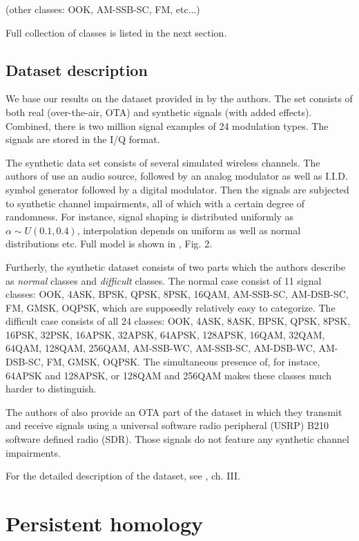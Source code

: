 \documentclass[12pt]{article}
\theoremstyle{plain}
\theoremstyle{definition}
\theoremstyle{remark}
\begin{document}
(other classes: OOK, AM-SSB-SC, FM, etc...)

	Full collection of classes is listed in the next section.
	

	
	\subsection{Dataset description}
	
	We base our results on the dataset provided in \cite{ORC} by the authors. The set consists of both real (over-the-air, OTA) and synthetic signals (with added effects). Combined, there is two million signal examples of 24 modulation types. The signals are stored in the I/Q format.
	
	The synthetic data set consists of several simulated wireless channels. The authors of \cite{ORC} use an audio source, followed by an analog modulator as well as I.I.D. symbol generator followed by a digital modulator. Then the signals are subjected to synthetic channel impairments, all of which with a certain degree of randomness. For instance, signal shaping is distributed uniformly as $\alpha \sim U(0.1, 0.4)$, interpolation depends on uniform as well as normal distributions etc. Full model is shown in \cite{ORC}, Fig. 2.
	
	Furtherly, the synthetic dataset consists of two parts which the authors describe as \textit{normal} classes and \textit{difficult} classes. The normal case consist of 11 signal classes: OOK, 4ASK, BPSK, QPSK, 8PSK, 16QAM, AM-SSB-SC, AM-DSB-SC, FM, GMSK, OQPSK, which are supposedly relatively easy to categorize. The difficult case consists of all 24 classes: OOK, 4ASK, 8ASK, BPSK, QPSK, 8PSK, 16PSK, 32PSK, 16APSK, 32APSK, 64APSK, 128APSK, 16QAM, 32QAM, 64QAM, 128QAM, 256QAM, AM-SSB-WC, AM-SSB-SC, AM-DSB-WC, AM-DSB-SC, FM, GMSK, OQPSK. The simultaneous presence of, for instace,  64APSK and 128APSK, or 128QAM and 256QAM makes these classes much harder to distinguish.
	
	The authors of \cite{ORC} also provide an OTA part of the dataset in which they transmit and receive signals using a universal software radio peripheral (USRP) B210 software defined radio (SDR). Those signals do not feature any synthetic channel impairments.
		
	For the detailed description of the dataset, see \cite{ORC}, ch. III.
	
	\section{Persistent homology}
	
\end{document}
